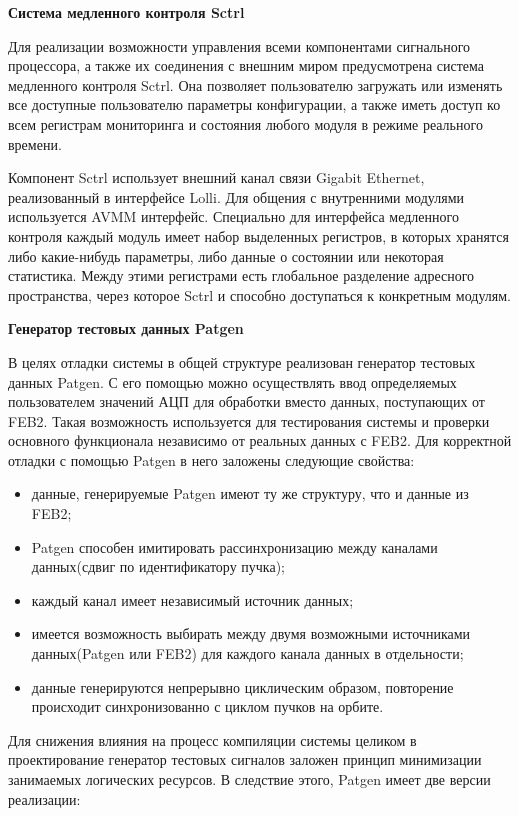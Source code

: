 \textbf{Система медленного контроля Sctrl}\par
Для реализации возможности управления всеми компонентами сигнального процессора, а также их соединения с внешним миром предусмотрена система медленного контроля Sctrl. Она позволяет пользователю загружать или изменять все доступные пользователю параметры конфигурации, а также иметь доступ ко всем регистрам мониторинга и состояния любого модуля в режиме реального времени.\par
Компонент Sctrl использует внешний канал связи Gigabit Ethernet, реализованный в интерфейсе Lolli. Для общения с внутренними модулями используется AVMM интерфейс. Специально для интерфейса медленного контроля каждый модуль имеет набор выделенных регистров, в которых хранятся либо какие-нибудь параметры, либо данные о состоянии или некоторая статистика. Между этими регистрами есть глобальное разделение адресного пространства, через которое Sctrl и способно доступаться к конкретным модулям.\par
\textbf{Генератор тестовых данных Patgen}\par
В целях отладки системы в общей структуре реализован генератор тестовых данных Patgen. С его помощью можно осуществлять ввод определяемых пользователем значений АЦП для обработки вместо данных, поступающих от FEB2. Такая возможность используется для тестирования системы и проверки основного функционала независимо от реальных данных с FEB2. Для корректной отладки с помощью Patgen в него заложены следующие свойства:\par
\begin{itemize}
    \item данные, генерируемые Patgen имеют ту же структуру, что и данные из FEB2;
    \item Patgen способен имитировать рассинхронизацию между каналами данных(сдвиг по идентификатору пучка);
    \item каждый канал имеет независимый источник данных;
    \item имеется возможность выбирать между двумя возможными источниками данных(Patgen или FEB2) для каждого канала данных в отдельности;
    \item данные генерируются непрерывно циклическим образом, повторение происходит синхронизованно с циклом пучков на орбите.
\end{itemize}\par
Для снижения влияния на процесс компиляции системы целиком в проектирование генератор тестовых сигналов заложен принцип минимизации занимаемых логических ресурсов. В следствие этого, Patgen имеет две версии реализации:\par
